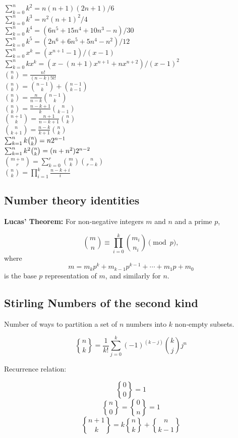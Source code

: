 \documentclass[portrait, 8pt, a4paper, oneside, twocolumn]{extarticle}
\begin{document}
$\sum_{k=0}^{n}k^{2}=n(n+1)(2n+1)/6$\\
$\sum_{k=0}^{n}k^{3}=n^{2}(n+1)^{2}/4$\\
$\sum_{k=0}^{n}k^{4}=(6n^{5}+15n^{4}+10n^{3}-n)/30$\\
$\sum_{k=0}^{n}k^{5}=(2n^{6}+6n^{5}+5n^{4}-n^{2})/12$\\
$\sum_{k=0}^{n}x^{k}=(x^{n+1}-1)/(x-1)$\\
$\sum_{k=0}^{n}kx^{k}=(x-(n+1)x^{n+1}+nx^{n+2})/(x-1)^{2}$\\
${n \choose k}=\frac{n!}{(n-k)!k!}$\\
${n \choose k}={n-1 \choose k}+{n-1 \choose k-1}$\\
${n \choose k}=\frac{n}{n-k}{n-1 \choose k}$\\
${n \choose k}=\frac{n-k+1}{k}{n \choose k-1}$\\
${n+1 \choose k}=\frac{n+1}{n-k+1}{n \choose k}$\\
${n \choose k+1}=\frac{n-k}{k+1}{n \choose k}$\\
$\sum_{k=1}^{n}k\tbinom{n}{k}=n2^{n-1}$\\
$\sum_{k=1}^{n}k^{2}\tbinom{n}{k}=(n+n^{2})2^{n-2}$\\
${m+n \choose r}=\sum_{k=0}^{r}{m \choose k}{n \choose r-k}$\\
${n \choose k}=\prod_{i=1}^{k}\frac{n-k+i}{i}$\\

\subsection{Number theory identities}
\textbf{Lucas' Theorem:} For non-negative integers $m$ and $n$ and a prime $p$,

$$\binom{m}{n}\equiv\prod_{i=0}^k\binom{m_i}{n_i}\pmod p,$$
where
$$m=m_kp^k+m_{k-1}p^{k-1}+\cdots +m_1p+m_0$$
is the base $p$ representation of $m$, and similarly for $n$.

\subsection{Stirling Numbers of the second kind}
Number of ways to partition a set of $n$ numbers into $k$ non-empty subsets.

$${n \brace k}=\frac{1}{k!}\sum_{j=0}^{k}(-1)^{(k-j)}{k \choose j}j^n$$

Recurrence relation:

$${0 \brace 0}=1$$
$${n \brace 0}={0 \brace n}=1$$
$${n+1 \brace k}=k{n \brace k}+{n \brace k-1}$$
\end{document}
